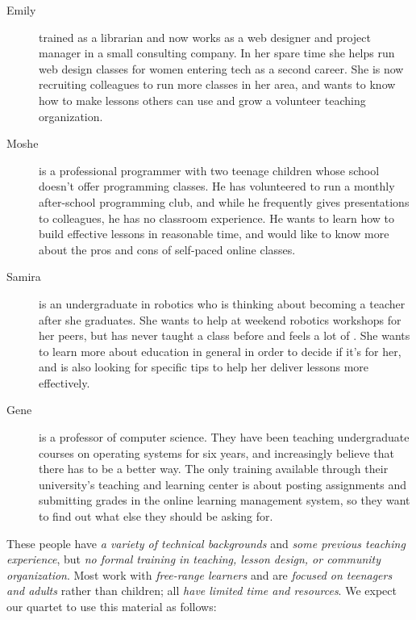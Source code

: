 \begin{description}

\item[Emily]
  trained as a librarian
  and now works as a web designer and project manager in a small consulting company.
  In her spare time she helps run web design classes for women entering tech as a second career.
  She is now recruiting colleagues to run more classes in her area,
  and wants to know how to make lessons others can use
  and grow a volunteer teaching organization.

\item[Moshe]
  is a professional programmer with two teenage children
  whose school doesn't offer programming classes.
  He has volunteered to run a monthly after-school programming club,
  and while he frequently gives presentations to colleagues,
  he has no classroom experience.
  He wants to learn how to build effective lessons in reasonable time,
  and would like to know more about the pros and cons of self-paced online classes.

\item[Samira]
  is an undergraduate in robotics who is thinking about becoming a teacher after she graduates.
  She wants to help at weekend robotics workshops for her peers,
  but has never taught a class before
  and feels a lot of .
  She wants to learn more about education in general in order to decide if it's for her,
  and is also looking for specific tips to help her deliver lessons more effectively.

\item[Gene]
  is a professor of computer science.
  They have been teaching undergraduate courses on operating systems for six years,
  and increasingly believe that there has to be a better way.
  The only training available through their university's teaching and learning center
  is about posting assignments and submitting grades in the online learning management system,
  so they want to find out what else they should be asking for.

\end{description}

These people have \emph{a variety of technical backgrounds}
and \emph{some previous teaching experience},
but \emph{no formal training in teaching, lesson design, or community organization}.
Most work with \emph{free-range learners}
and are \emph{focused on teenagers and adults}
rather than children;
all \emph{have limited time and resources}.
We expect our quartet to use this material as follows:

